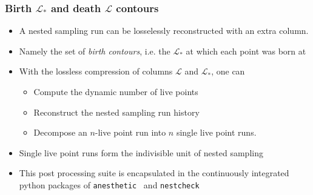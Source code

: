 \documentclass[aspectratio=169,handout]{beamer}
\begin{document}
\begin{frame}
    \frametitle{Birth $\mathcal{L}_*$ and death $\mathcal{L}$ contours}
    \begin{itemize}
        \item A nested sampling run can be losselessly reconstructed with an extra column.
        \item Namely the set of \emph{birth contours}, i.e. the $\mathcal{L}_*$ at which each point was born at
        \item With the lossless compression of columns $\mathcal{L}$ and $\mathcal{L}_*$, one can 
            \begin{itemize}
                \item Compute the dynamic number of live points 
                \item Reconstruct the nested sampling run history
                \item Decompose an $n$-live point run into $n$ single live point runs.
            \end{itemize}
        \item Single live point runs form the indivisible unit of nested sampling
        \item This post processing suite is encapsulated in the continuously integrated python packages of \texttt{anesthetic}~ and \texttt{nestcheck}~
    \end{itemize}

\end{frame}
\end{document}
